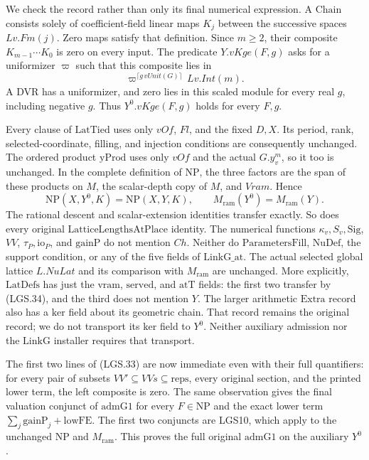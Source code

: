 \documentclass[11pt,a4paper]{article}
\numberwithin{equation}{section}
\theoremstyle{remark}\newtheorem{remark}[theorem]{Remark}
\begin{document}
We check the record rather than only its final numerical
expression.  A \(\mathrm{Chain}\) consists solely of
coefficient-field linear maps \(K_j\) between the
successive spaces \(Lv.Fm(j)\).  Zero maps satisfy that
definition.  Since \(m\ge2\), their composite
\(K_{m-1}\cdots K_0\) is zero on every input.
The predicate \(Y.vKge(F,g)\) asks for a uniformizer
\(\varpi\) such that this composite lies in
\[
 \varpi^{\lceil g\,vUnit(G)\rceil}\,Lv.Int(m).
 \]
A DVR has a uniformizer, and zero lies in this scaled
module for every real \(g\), including negative \(g\).
Thus \(Y^0.vKge(F,g)\) holds for every \(F,g\).

Every clause of \(\mathrm{LatTied}\) uses only \(vOf\),
\(Fl\), and the fixed \(D,X\).  Its period, rank,
selected-coordinate, filling, and injection conditions
are consequently unchanged.  The ordered product
\(\mathrm{yProd}\) uses only \(vOf\) and the actual
\(G.y_v^m\), so it too is unchanged.  In the complete
definition of \(\mathrm{NP}\), the three factors are
the span of these products on \(M\), the scalar-depth
copy of \(M\), and \(Vram\).  Hence
\[
 \mathrm{NP}(X,Y^0,K)=\mathrm{NP}(X,Y,K),\qquad
 M_{\mathrm{ram}}(Y^0)=M_{\mathrm{ram}}(Y).             \tag{LGS.34}
\]
The rational descent and scalar-extension identities
transfer exactly.  So does every original
\(\mathrm{LatticeLengthsAtPlace}\) identity.  The numerical
functions \(\kappa_v,S_v,\mathrm{Sig}\), \(VV\),
\(\tau_P,\mathrm{io}_P\), and \(\mathrm{gainP}\)
do not mention \(Ch\).
Neither do \(\mathrm{ParametersFill}\),
\(\mathrm{NuDef}\), the support condition, or any of
the five fields of \(\mathrm{LinkG\_\allowbreak at}\).
The actual selected global lattice \(L.NuLat\) and
its comparison with \(M_{\mathrm{ram}}\) are unchanged.
More explicitly, \(\mathrm{LatDefs}\) has just the
\(\mathrm{vram}\), \(\mathrm{served}\), and
\(\mathrm{atT}\) fields: the first two transfer by
(LGS.34), and the third does not mention \(Y\).
The larger arithmetic \(\mathrm{Extra}\) record
also has a \(\mathrm{ker}\) field about its geometric
chain.  That record remains the original record;
we do not transport its \(\mathrm{ker}\) field to
\(Y^0\).  Neither auxiliary admission nor the
\(\mathrm{LinkG}\) installer requires that transport.

The first two lines of (LGS.33) are now immediate even
with their full quantifiers: for every pair of subsets
\(VV'\subseteq VVs\subseteq\mathrm{reps}\), every
original section, and the printed lower term, the
left composite is zero.  The same observation gives
the final valuation conjunct of \(\mathrm{admG1}\)
for every \(F\in\mathrm{NP}\) and the exact lower term
\(\sum_j\mathrm{gainP}_j+\mathrm{lowFE}\).
The first two conjuncts are LGS10, which apply to the
unchanged \(\mathrm{NP}\) and \(M_{\mathrm{ram}}\).
This proves the full original \(\mathrm{admG1}\) on
the auxiliary \(Y^0\).
\end{document}
